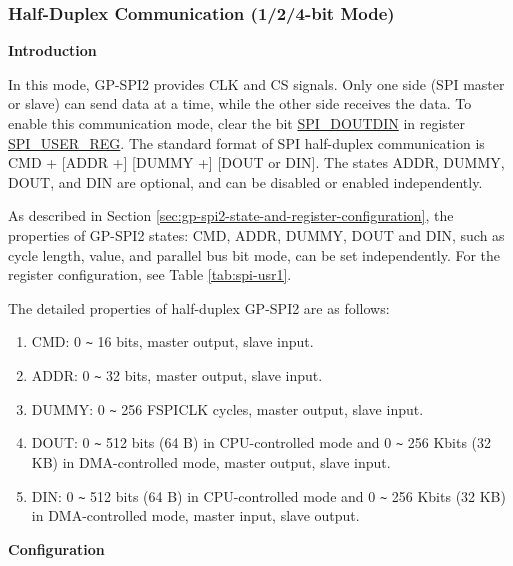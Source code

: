 \documentclass[main\_\_EN.tex]{subfiles}
\begin{document}
\subsubsection{Half-Duplex Communication (1/2/4-bit Mode)}
\label{sec:gp-spi2-1/2/8-bits}

\textbf{Introduction}

In this mode, GP-SPI2 provides CLK and CS signals. Only one side (SPI master or slave) can send data at a time, while the other side receives the data. To enable this communication mode, clear the bit \hyperref[fielddesc:SPIDOUTDIN]{SPI\_DOUTDIN} in register \hyperref[regdesc:SPIUSERREG]{SPI\_USER\_REG}. The standard format of SPI half-duplex communication is CMD + [ADDR +] [DUMMY +] [DOUT or DIN]. The states ADDR, DUMMY, DOUT, and DIN are optional, and can be disabled or enabled independently.

As described in Section \ref{sec:gp-spi2-state-and-register-configuration}, the properties of GP-SPI2 states: CMD, ADDR, DUMMY, DOUT and DIN, such as cycle length, value, and parallel bus bit mode, can be set independently. For the register configuration, see Table \ref{tab:spi-usr1}.

The detailed properties of half-duplex GP-SPI2 are as follows:

\begin{enumerate}
    \item CMD: 0 \verb+~+ 16 bits, master output, slave input.
    \item ADDR: 0 \verb+~+ 32 bits, master output, slave input.
    \item DUMMY: 0 \verb+~+ 256 FSPICLK cycles, master output, slave input.
    \item DOUT: 0 \verb+~+ 512 bits (64 B) in CPU-controlled mode and 0 \verb+~+ 256 Kbits (32 KB) in DMA-controlled mode, master output, slave input.

    \item DIN: 0 \verb+~+ 512 bits (64 B) in CPU-controlled mode and 0 \verb+~+ 256 Kbits (32 KB) in DMA-controlled mode, master input, slave output.
\end{enumerate}

\textbf{Configuration}
\end{document}
